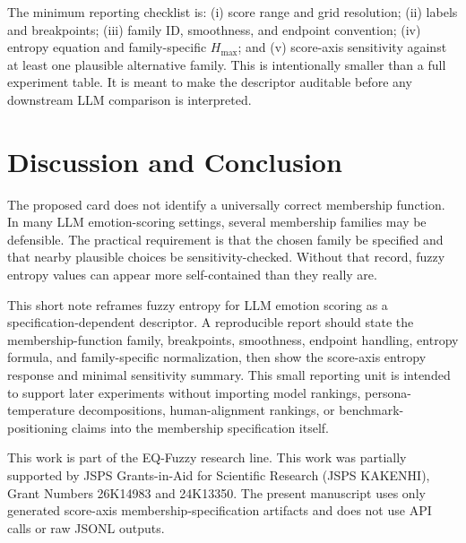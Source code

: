 \documentclass[a4paper,10pt,twocolumn]{myjarticle2}
\begin{document}
The minimum reporting checklist is: (i) score range and grid resolution;
(ii) labels and breakpoints; (iii) family ID, smoothness, and endpoint
convention; (iv) entropy equation and family-specific $H_{\max}$; and
(v) score-axis sensitivity against at least one plausible alternative family.
This is intentionally smaller than a full experiment table. It is meant to
make the descriptor auditable before any downstream LLM comparison is
interpreted.

\section{Discussion and Conclusion}

The proposed card does not identify a universally correct membership function.
In many LLM emotion-scoring settings, several membership families may be
defensible. The practical requirement is that the chosen family be specified
and that nearby plausible choices be sensitivity-checked. Without that record,
fuzzy entropy values can appear more self-contained than they really are.

This short note reframes fuzzy entropy for LLM emotion scoring as a
specification-dependent descriptor. A reproducible report should state the
membership-function family, breakpoints, smoothness, endpoint handling,
entropy formula, and family-specific normalization, then show the
score-axis entropy response and minimal sensitivity summary. This small
reporting unit is intended to support later experiments without importing
model rankings, persona-temperature decompositions, human-alignment rankings,
or benchmark-positioning claims into the membership specification itself.

\vspace{1mm}
\par\noindent

This work is part of the EQ-Fuzzy research line. This work was partially
supported by JSPS Grants-in-Aid for Scientific Research (JSPS KAKENHI), Grant
Numbers 26K14983 and 24K13350. The present manuscript uses only generated
score-axis membership-specification artifacts and does not use API calls or raw
JSONL outputs.
\end{document}
